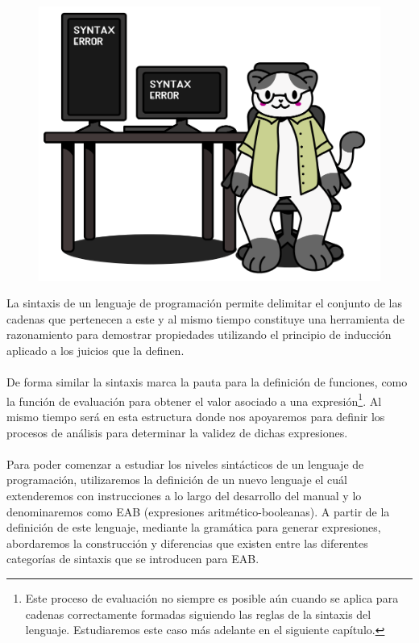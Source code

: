 
\begin{figure}[htbp]
    \centerline{\includegraphics[scale=.38]{assets/03_gatito_sintaxis.PNG}}       
\end{figure}


La sintaxis de un lenguaje de programación permite delimitar el conjunto de las cadenas que pertenecen a este y al mismo tiempo constituye una herramienta de razonamiento para demostrar propiedades utilizando el principio de inducción aplicado a los juicios que la definen. \\\\
De forma similar la sintaxis marca la pauta para la definición de funciones, como la función de evaluación para obtener el valor asociado a una expresión\footnote{Este proceso de evaluación no siempre es posible aún cuando se aplica para cadenas correctamente formadas siguiendo las reglas de la sintaxis del lenguaje. Estudiaremos este caso más adelante en el siguiente capítulo.}.  Al mismo tiempo será en esta estructura donde nos apoyaremos para definir los procesos de análisis para determinar la validez de dichas expresiones.\\\\
Para poder comenzar a estudiar los niveles sintácticos de un lenguaje de programación, utilizaremos la definición de un nuevo lenguaje el cuál extenderemos con instrucciones a lo largo del desarrollo del manual y lo denominaremos como \textsf{EAB} (expresiones aritmético-booleanas). A partir de la definición de este lenguaje, mediante la gramática para generar expresiones, abordaremos la construcción y diferencias que existen entre las diferentes categorías de sintaxis que se introducen para \textsf{EAB}.
